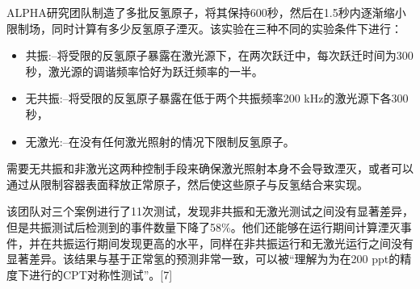 ALPHA研究团队制造了多批反氢原子，将其保持600秒，然后在1.5秒内逐渐缩小限制场，同时计算有多少反氢原子湮灭。该实验在三种不同的实验条件下进行：
\begin{itemize}
\item 共振:–将受限的反氢原子暴露在激光源下，在两次跃迁中，每次跃迁时间为300秒，激光源的调谐频率恰好为跃迁频率的一半。
\item 无共振:–将受限的反氢原子暴露在低于两个共振频率200 kHz的激光源下各300秒，
\item 无激光:–在没有任何激光照射的情况下限制反氢原子。
\end{itemize}
需要无共振和非激光这两种控制手段来确保激光照射本身不会导致湮灭，或者可以通过从限制容器表面释放正常原子，然后使这些原子与反氢结合来实现。

该团队对三个案例进行了11次测试，发现非共振和无激光测试之间没有显著差异，但是共振测试后检测到的事件数量下降了58\%。他们还能够在运行期间计算湮灭事件，并在共振运行期间发现更高的水平，同样在非共振运行和无激光运行之间没有显著差异。该结果与基于正常氢的预测非常一致，可以被“理解为为在200 ppt的精度下进行的CPT对称性测试”。[7]